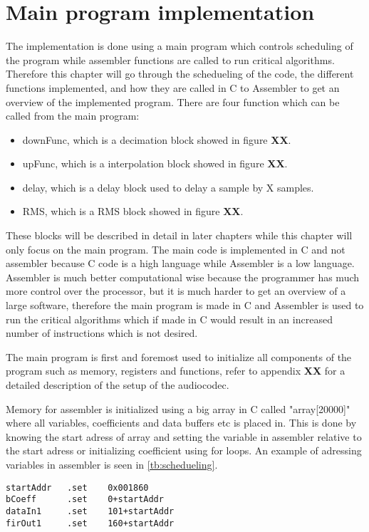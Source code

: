 \chapter{Main program implementation}
The implementation is done using a main program which controls scheduling of the program while assembler functions are called to run critical algorithms. Therefore this chapter will go through the schedueling of the code, the different functions implemented, and how they are called in C to Assembler to get an overview of the implemented program. There are four function which can be called from the main program:
\begin{itemize}
\item downFunc, which is a decimation block showed in figure \textbf{XX}.
\item upFunc, which is a interpolation block showed in figure \textbf{XX}.
\item delay, which is a delay block used to delay a sample by X samples.
\item RMS, which is a RMS block showed in figure \textbf{XX}. 
\end{itemize}
These blocks will be described in detail in later chapters while this chapter will only focus on the main program. The main code is implemented in C and not assembler because C code is a high language while Assembler is a low language. Assembler is much better computational wise because the programmer has much more control over the processor, but it is much harder to get an overview of a large software, therefore the main program is made in C and Assembler is used to run the critical algorithms which if made in C would result in an increased number of instructions which is not desired. 

The main program is first and foremost used to initialize all components of the program such as memory, registers and functions, refer to appendix \textbf{XX} for a detailed description of the setup of the audiocodec. 

Memory for assembler is initialized using a big array in C called "array[20000]" where all variables, coefficients and data buffers etc is placed in. This is done by knowing the start adress of array and setting the variable in assembler relative to the start adress or initializing coefficient using for loops. An example of adressing variables in assembler is seen in \autoref{tb:schedueling}.

\begin{lstlisting}[language={[x86masm]Assembler}, caption = {Adressing assembler},label={listingAdressing}]
startAddr	.set	0x001860
bCoeff		.set	0+startAddr
dataIn1		.set	101+startAddr
firOut1		.set	160+startAddr
\end{lstlisting}

